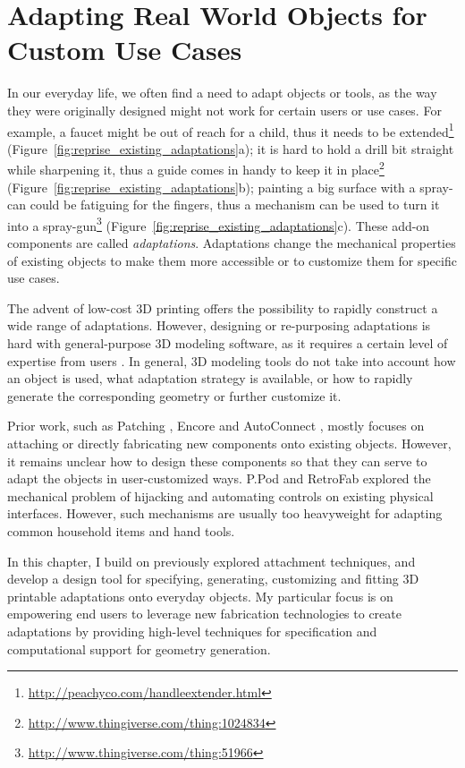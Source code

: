 \chapter{Adapting Real World Objects for Custom Use Cases}

In our everyday life, we often find a need to adapt objects or tools, as the way they were originally designed might not work for certain users or use cases. For example, a faucet might be out of reach for a child, thus it needs to be extended\footnote{\url{http://peachyco.com/handleextender.html}} (Figure~\ref{fig:reprise_existing_adaptations}a); it is hard to hold a drill bit straight while sharpening it, thus a guide comes in handy to keep it in place\footnote{\url{http://www.thingiverse.com/thing:1024834}} (Figure~\ref{fig:reprise_existing_adaptations}b); painting a big surface with a spray-can could be fatiguing for the fingers, thus a mechanism can be used to turn it into a spray-gun\footnote{\url{http://www.thingiverse.com/thing:51966}} (Figure~\ref{fig:reprise_existing_adaptations}c). These add-on components are called \textit{adaptations}. Adaptations change the mechanical properties of existing objects to make them more accessible or to customize them for specific use cases.

The advent of low-cost 3D printing offers the possibility to rapidly construct a wide range of adaptations. However, designing or re-purposing adaptations is hard with general-purpose 3D modeling software, as it requires a certain level of expertise from users \cite{hurst2013making}. In general, 3D modeling tools do not take into account how an object is used, what adaptation strategy is available, or how to rapidly generate the corresponding geometry or further customize it.

Prior work, such as Patching \cite{teibrich2015patching}, Encore \cite{chen2015encore} and AutoConnect \cite{koyama2015autoconnect}, mostly focuses on attaching or directly fabricating new components onto existing objects. However, it remains unclear how to design these components so that they can serve to adapt the objects in user-customized ways. P.Pod \cite{davidoff2011mechanical} and RetroFab \cite{ramaker2015retrofab} explored the mechanical problem of hijacking and automating controls on existing physical interfaces. However, such mechanisms are usually too heavyweight for adapting common household items and hand tools. 

In this chapter, I build on previously explored attachment techniques, and develop a design tool for specifying, generating, customizing and fitting 3D printable adaptations onto everyday objects. My particular focus is on empowering end users to leverage new fabrication technologies to create adaptations by providing high-level techniques for specification and computational support for geometry generation.

